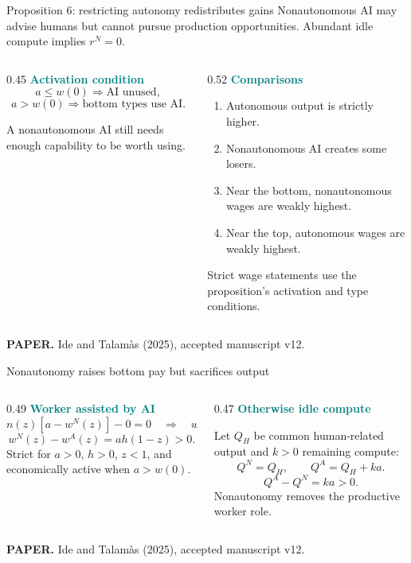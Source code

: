 \documentclass[aspectratio=169,11pt]{beamer}
\newcommand{\key}[1]{\textcolor{Teal}{\textbf{#1}}}
\newcommand{\sourcefoot}{\scriptsize\color{Muted}\textbf{PAPER.} Ide and Talam\`as (2025), accepted manuscript v12.}
\begin{document}
\begin{frame}{Proposition 6: restricting autonomy redistributes gains}
\small
Nonautonomous AI may advise humans but cannot pursue production opportunities.
Abundant idle compute implies $r^N=0$.

\begin{columns}[T,totalwidth=\textwidth]
\begin{column}{0.45\textwidth}
  \key{Activation condition}
  \[
  a\le w(0)
  \Rightarrow \text{AI unused},
  \]
  \[
  a>w(0)
  \Rightarrow \text{bottom types use AI}.
  \]

  A nonautonomous AI still needs enough capability to be worth using.
\end{column}
\begin{column}{0.52\textwidth}
  \key{Comparisons}
  \begin{enumerate}\setlength\itemsep{0.07cm}
    \item Autonomous output is strictly higher.
    \item Nonautonomous AI creates some losers.
    \item Near the bottom, nonautonomous wages are weakly highest.
    \item Near the top, autonomous wages are weakly highest.
  \end{enumerate}
  Strict wage statements use the proposition's activation and type conditions.
\end{column}
\end{columns}

\vfill
\sourcefoot
\end{frame}

\begin{frame}{Nonautonomy raises bottom pay but sacrifices output}
\small
\begin{columns}[T,totalwidth=\textwidth]
\begin{column}{0.49\textwidth}
  \key{Worker assisted by AI}
  \[
  n(z)[a-w^N(z)]-0=0
  \quad\Rightarrow\quad
  w^N(z)=a.
  \]
  \[
  \boxed{w^N(z)-w^A(z)=ah(1-z)>0}.
  \]
  Strict for $a>0$, $h>0$, $z<1$, and economically active when
  $a>w(0)$.
\end{column}
\begin{column}{0.47\textwidth}
  \key{Otherwise idle compute}

  Let $Q_H$ be common human-related output and $k>0$ remaining compute:
  \[
  Q^N=Q_H,
  \qquad
  Q^A=Q_H+ka.
  \]
  \[
  \boxed{Q^A-Q^N=ka>0}.
  \]
  Nonautonomy removes the productive worker role.
\end{column}
\end{columns}

\vfill
\sourcefoot
\end{frame}
\end{document}
